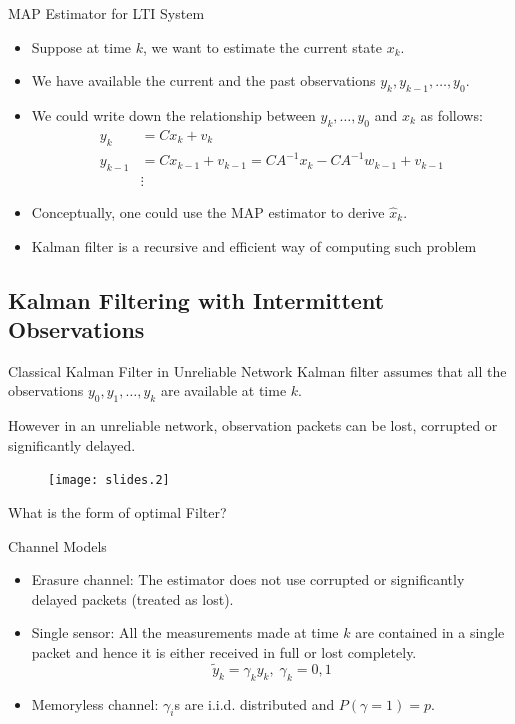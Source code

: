 \documentclass[10pt]{beamer}
\DeclareMathOperator{\1}{\textbf{1}}
\begin{document}
\begin{frame}{MAP Estimator for LTI System}
  \begin{itemize}
    \item Suppose at time $k$, we want to estimate the current state $x_k$.
    \item We have available the current and the past observations $y_k,y_{k-1},\dots,y_0$.
    \item We could write down the relationship between $y_k,\dots,y_0$ and $x_k$ as follows:
      \begin{displaymath}
	\begin{split}
	  y_k& = C x_k + v_k \\
	  y_{k-1} & = Cx_{k-1}+v_{k-1} = CA^{-1}x_k -C A^{-1}w_{k-1} + v_{k-1}\\
		  &\vdots
	\end{split}
      \end{displaymath}
    \item Conceptually, one could use the MAP estimator to derive $\hat x_k$.
    \item Kalman filter is a recursive and efficient way of computing such problem 
  \end{itemize}
\end{frame}

\subsection{Kalman Filtering with Intermittent Observations}
\frame{\tableofcontents[currentsection]}

\begin{frame}{Classical Kalman Filter in Unreliable Network}
  Kalman filter assumes that all the observations $y_0,y_1,\ldots,y_k$ are available at time $k$.

  However in an unreliable network, observation packets can be lost, corrupted or significantly delayed.
  \begin{figure}[<h>]
    \begin{center}
      \texttt{[image: slides.2]}
    \end{center}
  \end{figure}
  What is the form of optimal Filter? 
\end{frame}

\begin{frame}{Channel Models}  
  \begin{itemize}
    \item Erasure channel: The estimator does not use corrupted or significantly delayed packets (treated as lost). 
    \item Single sensor: All the measurements made at time $k$ are contained in a single packet and hence it is either received in full or lost completely.
      \[
	\widetilde y_k = \gamma_k y_k,\;\gamma_k=0,1
      \]
    \item Memoryless channel: $\gamma_i$s are i.i.d. distributed and $P(\gamma = 1) = p$.
  \end{itemize}
\end{frame}
\end{document}
